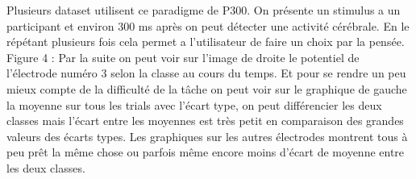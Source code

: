 \documentclass{article}[12pt]
\begin{document}
Plusieurs dataset utilisent ce paradigme de P300. On présente un stimulus a un participant et environ 300 ms après on peut détecter une activité cérébrale. En le répétant plusieurs fois cela permet a l'utilisateur de faire un choix par la pensée.\\


Figure 4 : Par la suite on peut voir sur l'image de droite le potentiel de l’électrode numéro 3 selon la classe au cours du temps. Et pour se rendre un peu mieux compte de la difficulté de la tâche on peut voir sur le graphique de gauche la moyenne sur tous les trials avec l’écart type, on peut différencier les deux classes mais l’écart entre les moyennes est très petit en comparaison des grandes valeurs des écarts types. Les graphiques sur les autres électrodes montrent tous à peu prêt la même chose ou parfois même encore moins d’écart de moyenne entre les deux classes.
\end{document}

